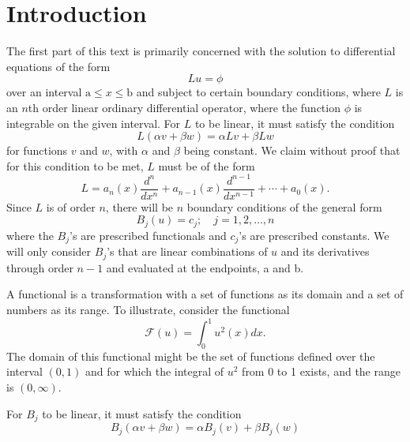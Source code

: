 \section{Introduction}
The first part of this text is primarily concerned with the solution to differential equations of the form
\begin{equation}
    Lu=\phi
\end{equation}
over an interval \(\mathrm{a} \leq x \leq \mathrm{b}\) and subject to certain boundary conditions, where \(L\) is an \(n\)th order linear ordinary differential operator, where the function \(\phi\) is integrable on the given interval. For \(L\) to be linear, it must satisfy the condition
\begin{equation}
	L(\alpha v + \beta w) = \alpha Lv + \beta Lw
\end{equation}
for functions \(v\) and \(w\), with \(\alpha\) and \(\beta\) being constant. We claim without proof that for this condition to be met, \(L\) must be of the form
\begin{equation} 
	L = a_n(x) \frac{d^n}{dx^n} + a_{n-1}(x) \frac{d^{n-1}}{dx^{n-1}} + \cdots + a_0(x).
\end{equation}
Since \(L\) is of order \(n\), there will be \(n\) boundary conditions of the general form 
\begin{equation}
	B_j (u) = c_j;\quad j=1,2,\dots,n
\end{equation}
where the \(B_j\)'s are prescribed functionals and \(c_j\)'s are prescribed constants. We will only consider \(B_j\)'s that are linear combinations of \(u\) and its derivatives through order \(n-1\) and evaluated at the endpoints, a and b. 

A functional is a transformation with a set of functions as its domain and a set of numbers as its range. To illustrate, consider the functional 
\begin{equation}
	\mathcal{F}(u) = \int_{0}^{1} u^2(x)dx.
\end{equation}
The domain of this functional might be the set of functions defined over the interval \((0,1)\) and for which the integral of \(u^2\) from 0 to 1 exists, and the range is \((0, \infty)\).

For \(B_j\) to be linear, it must satisfy the condition
\begin{equation}
	B_j(\alpha v + \beta w) = \alpha B_j (v) + \beta B_j(w)
\end{equation}
